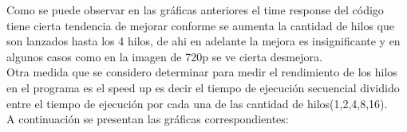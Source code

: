 \documentclass{IEEEtran}
\begin{document}
\begin{itemize}

\end{itemize}

Como se puede observar en las gráficas anteriores el time response del código tiene cierta tendencia de  mejorar conforme se aumenta la cantidad de hilos que son lanzados hasta los 4 hilos, de ahi en adelante la mejora es insignificante y en algunos casos como en la imagen de 720p se ve cierta desmejora.\\

Otra medida que se considero determinar para medir el rendimiento de los hilos en el programa es el speed up es decir el tiempo de ejecución secuencial dividido entre el tiempo de ejecución por cada una de las cantidad de hilos(1,2,4,8,16). \\
A continuación se presentan las gráficas correspondientes:
\end{document}
